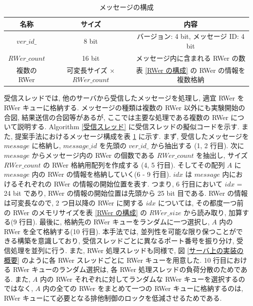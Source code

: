 \begin{table}[t!]
    \caption{メッセージの構成}
    \label{メッセージの構成}
    \centering
    \begin{tabular}{ccc}
        \hline
        名称  &  サイズ  &  内容 \\
        \hline \hline
        $ver\_id\_$  &  8 bit  &  バージョン: 4 bit, メッセージ ID: 4 bit \\
        \hline
        $RWer\_count$  &  16 bit  &  メッセージ内に含まれる RWer の数 \\
        \hline
        複数の RWer  &  可変長サイズ $\times$ $RWer\_count$  &  表 \ref{RWer の構成} の RWer の情報を複数格納 \\
        \hline
    \end{tabular}
\end{table}

受信スレッドでは, 他のサーバから受信したメッセージを処理し, 適宜 RWer を RWer キューに格納する. メッセージの種類は複数の RWer 以外にも実験開始の合図, 結果送信の合図等があるが, ここでは主要な処理である複数の RWer について説明する. Algorithm \ref{受信スレッド} に受信スレッドの擬似コードを示す. また, 提案手法におけるメッセージ構成を表 \ref{メッセージの構成} に示す. まず, 受信したメッセージを $message$ に格納し, $message\_id$ を先頭の $ver\_id\_$ から抽出する (1, 2 行目). 次に $message$ からメッセージ内の RWer の個数である $RWer\_count$ を抽出し, サイズ $RWer\_count$ の RWer 格納用配列を作成する (4, 5 行目). そしてその配列 $A$ に $message$ 内の RWer の情報を格納していく(6 - 9 行目). $idx$ は $message$ 内におけるそれぞれの RWer の情報の開始位置を表す. つまり, 6 行目において $idx$ = 24 bit であり, RWer の情報の開始位置は先頭から 25 bit 目である. RWer の情報は可変長なので, 2 つ目以降の RWer に関する $idx$ については, その都度一つ前の RWer のメモリサイズを表 \ref{RWer の構成} の $RWer\_size$ から読み取り, 加算する(9 行目). 最後に, 格納先の RWer キューをランダムに一つ選択し, $A$ 内の RWer を全て格納する(10 行目). 本手法では, 並列性を可能な限り保つことができる構築を意識しており, 受信スレッドごとに異なるポート番号を振り分け, 受信処理を並列に行う. また, RWer 処理スレッドも同様で, 図 \ref{サーバ上の実装の概要} のように各 RWer スレッドごとに RWer キューを用意した. 10 行目における RWer キューのランダム選択は, 各 RWer 処理スレッドの負荷分散のためである. また, $A$ 内の RWer それぞれに対してランダムな RWer キューを選択するのではなく, $A$ 内の全ての RWer をまとめて一つの RWer キューに格納するのは, RWer キューにて必要となる排他制御のロックを低減させるためである. 

